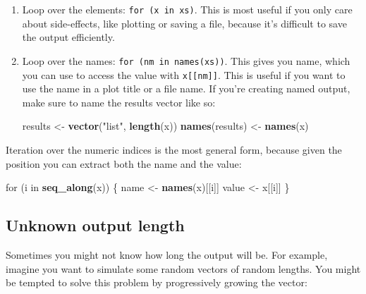 \documentclass[]{book}
\newenvironment{Shaded}{\begin{snugshade}}{\end{snugshade}}
\newcommand{\KeywordTok}[1]{\textcolor[rgb]{0.13,0.29,0.53}{\textbf{{#1}}}}
\newcommand{\StringTok}[1]{\textcolor[rgb]{0.31,0.60,0.02}{{#1}}}
\newcommand{\NormalTok}[1]{{#1}}
\begin{document}
\begin{enumerate}
\def\labelenumi{\arabic{enumi}.}
\item
  Loop over the elements: \texttt{for\ (x\ in\ xs)}. This is most useful
  if you only care about side-effects, like plotting or saving a file,
  because it's difficult to save the output efficiently.
\item
  Loop over the names: \texttt{for\ (nm\ in\ names(xs))}. This gives you
  name, which you can use to access the value with
  \texttt{x{[}{[}nm{]}{]}}. This is useful if you want to use the name
  in a plot title or a file name. If you're creating named output, make
  sure to name the results vector like so:

\begin{Shaded}
\begin{Highlighting}[]
\NormalTok{results <-}\StringTok{ }\KeywordTok{vector}\NormalTok{(}\StringTok{"list"}\NormalTok{, }\KeywordTok{length}\NormalTok{(x))}
\KeywordTok{names}\NormalTok{(results) <-}\StringTok{ }\KeywordTok{names}\NormalTok{(x)}
\end{Highlighting}
\end{Shaded}
\end{enumerate}

Iteration over the numeric indices is the most general form, because
given the position you can extract both the name and the value:

\begin{Shaded}
\begin{Highlighting}[]
\NormalTok{for (i in }\KeywordTok{seq_along}\NormalTok{(x)) \{}
  \NormalTok{name <-}\StringTok{ }\KeywordTok{names}\NormalTok{(x)[[i]]}
  \NormalTok{value <-}\StringTok{ }\NormalTok{x[[i]]}
\NormalTok{\}}
\end{Highlighting}
\end{Shaded}

\subsection{Unknown output length}\label{unknown-output-length}

Sometimes you might not know how long the output will be. For example,
imagine you want to simulate some random vectors of random lengths. You
might be tempted to solve this problem by progressively growing the
vector:
\end{document}
